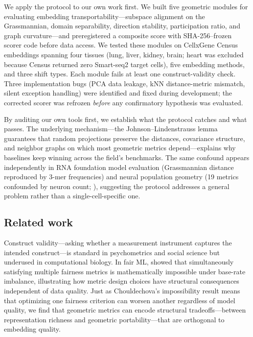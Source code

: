 \documentclass[10pt,letterpaper]{article}
\begin{document}
We apply the protocol to our own work first. We built five geometric modules for evaluating embedding transportability---subspace alignment on the Grassmannian, domain separability, direction stability, participation ratio, and graph curvature---and preregistered a composite score with SHA-256--frozen scorer code before data access. We tested these modules on CellxGene Census embeddings spanning four tissues (lung, liver, kidney, brain; heart was excluded because Census returned zero Smart-seq2 target cells), five embedding methods, and three shift types. Each module fails at least one construct-validity check. Three implementation bugs (PCA data leakage, kNN distance-metric mismatch, silent exception handling) were identified and fixed during development; the corrected scorer was refrozen \emph{before} any confirmatory hypothesis was evaluated.

By auditing our own tools first, we establish what the protocol catches and what passes. The underlying mechanism---the Johnson--Lindenstrauss lemma guarantees that random projections preserve the distances, covariance structure, and neighbor graphs on which most geometric metrics depend---explains why baselines keep winning across the field's benchmarks. The same confound appears independently in RNA foundation model evaluation (Grassmannian distance reproduced by 3-mer frequencies) and neural population geometry (19 metrics confounded by neuron count; \citealp{tower2026bracket}), suggesting the protocol addresses a general problem rather than a single-cell-specific one.


\subsection{Related work}

Construct validity---asking whether a measurement instrument captures the intended construct---is standard in psychometrics and social science but underused in computational biology. In fair ML, \citet{chouldechova2017impossibility} showed that simultaneously satisfying multiple fairness metrics is mathematically impossible under base-rate imbalance, illustrating how metric design choices have structural consequences independent of data quality. Just as Chouldechova's impossibility result means that optimizing one fairness criterion can worsen another regardless of model quality, we find that geometric metrics can encode structural tradeoffs---between representation richness and geometric portability---that are orthogonal to embedding quality.
\end{document}
